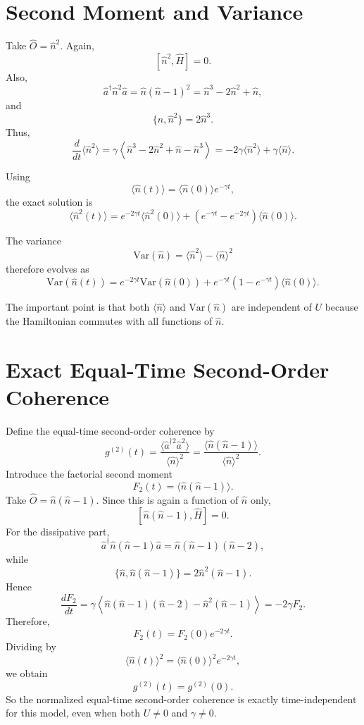 \documentclass[12pt]{article}
\begin{document}
\section*{Second Moment and Variance}
Take $\hat O=\hat n^2$. Again,
\[
[\hat n^2,\hat H]=0.
\]
Also,
\[
\hat a^\dagger \hat n^2 \hat a
= \hat n(\hat n-1)^2
= \hat n^3 - 2\hat n^2 + \hat n,
\]
and
\[
\{\hat n,\hat n^2\}=2\hat n^3.
\]
Thus,
\[
\frac{d}{dt}\langle \hat n^2\rangle
= \gamma\left\langle
\hat n^3 - 2\hat n^2 + \hat n - \hat n^3
\right\rangle
= -2\gamma \langle \hat n^2\rangle + \gamma \langle \hat n\rangle.
\]

Using
\[
\langle \hat n(t)\rangle = \langle \hat n(0)\rangle e^{-\gamma t},
\]
the exact solution is
\[
\boxed{
\langle \hat n^2(t)\rangle
= e^{-2\gamma t}\langle \hat n^2(0)\rangle
+ \left(e^{-\gamma t}-e^{-2\gamma t}\right)\langle \hat n(0)\rangle.
}
\]

The variance
\[
\mathrm{Var}(\hat n) = \langle \hat n^2\rangle - \langle \hat n\rangle^2
\]
therefore evolves as
\[
\boxed{
\mathrm{Var}(\hat n(t))
= e^{-2\gamma t}\mathrm{Var}(\hat n(0))
+ e^{-\gamma t}\left(1-e^{-\gamma t}\right)\langle \hat n(0)\rangle.
}
\]

The important point is that both $\langle \hat n\rangle$ and $\mathrm{Var}(\hat n)$ are independent of $U$ because the Hamiltonian commutes with all functions of $\hat n$.

\section*{Exact Equal-Time Second-Order Coherence}
Define the equal-time second-order coherence by
\[
g^{(2)}(t)
= \frac{\langle \hat a^{\dagger 2}\hat a^2\rangle}{\langle \hat n\rangle^2}
= \frac{\langle \hat n(\hat n-1)\rangle}{\langle \hat n\rangle^2}.
\]
Introduce the factorial second moment
\[
F_2(t)=\langle \hat n(\hat n-1)\rangle.
\]
Take $\hat O=\hat n(\hat n-1)$. Since this is again a function of $\hat n$ only,
\[
[\hat n(\hat n-1),\hat H]=0.
\]
For the dissipative part,
\[
\hat a^\dagger \hat n(\hat n-1)\hat a
= \hat n(\hat n-1)(\hat n-2),
\]
while
\[
\{\hat n,\hat n(\hat n-1)\}=2\hat n^2(\hat n-1).
\]
Hence
\[
\frac{dF_2}{dt}
= \gamma\left\langle
\hat n(\hat n-1)(\hat n-2)-\hat n^2(\hat n-1)
\right\rangle
= -2\gamma F_2.
\]
Therefore,
\[
\boxed{
F_2(t)=F_2(0)e^{-2\gamma t}.
}
\]
Dividing by
\[
\langle \hat n(t)\rangle^2=\langle \hat n(0)\rangle^2 e^{-2\gamma t},
\]
we obtain
\[
\boxed{
g^{(2)}(t)=g^{(2)}(0).
}
\]
So the normalized equal-time second-order coherence is exactly time-independent for this model, even when both $U\neq 0$ and $\gamma\neq 0$.
\end{document}
